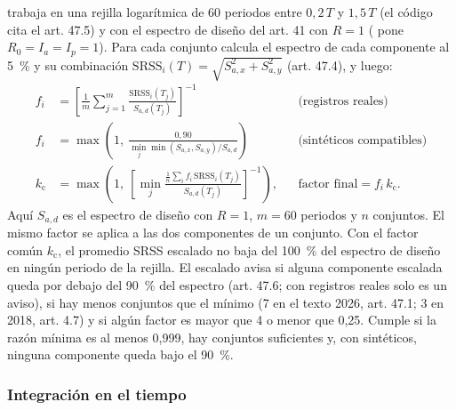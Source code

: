  trabaja en una rejilla logarítmica de 60 periodos entre $0{,}2\,T$ y
$1{,}5\,T$ (el código cita el art. 47.5) y con el espectro de diseño del art. 41 con $R = 1$
( pone $R_0 = I_a = I_p = 1$). Para cada conjunto calcula el espectro de cada componente al
5~\% y su combinación $\text{SRSS}_i(T) = \sqrt{S_{a,x}^2 + S_{a,y}^2}$ (art. 47.4), y luego:
\begin{align}
	f_i &= \left[\frac{1}{m}\sum_{j=1}^{m} \frac{\text{SRSS}_i(T_j)}{S_{a,d}(T_j)}\right]^{-1}
	&& \text{(registros reales)} \label{eq:sis-fi} \\
	f_i &= \max\!\left(1,\ \frac{0{,}90}{\min_j \min(S_{a,x}, S_{a,y})/S_{a,d}}\right)
	&& \text{(sintéticos compatibles)} \label{eq:sis-fi-compatible} \\
	k_{\text{c}} &= \max\!\left(1,\ \left[\min_j \frac{\frac{1}{n}\sum_i f_i\,\text{SRSS}_i(T_j)}{S_{a,d}(T_j)}\right]^{-1}\right),
	&& \text{factor final} = f_i\,k_{\text{c}} . \label{eq:sis-k}
\end{align}
Aquí $S_{a,d}$ es el espectro de diseño con $R = 1$, $m = 60$ periodos y $n$ conjuntos. El mismo factor se aplica a las
dos componentes de un conjunto. Con el factor común $k_{\text{c}}$, el promedio SRSS escalado no baja del 100~\% del
espectro de diseño en ningún periodo de la rejilla. El escalado avisa si alguna componente escalada queda por debajo del
90~\% del espectro (art. 47.6; con registros reales solo es un aviso), si hay menos conjuntos que el mínimo (7 en el
texto 2026, art. 47.1; 3 en 2018, art. 4.7) y si algún factor es mayor que 4 o menor que 0,25. Cumple si la razón
mínima es al menos 0,999, hay conjuntos suficientes y, con sintéticos, ninguna componente queda bajo el 90~\%.

\subsubsection{Integración en el tiempo}

